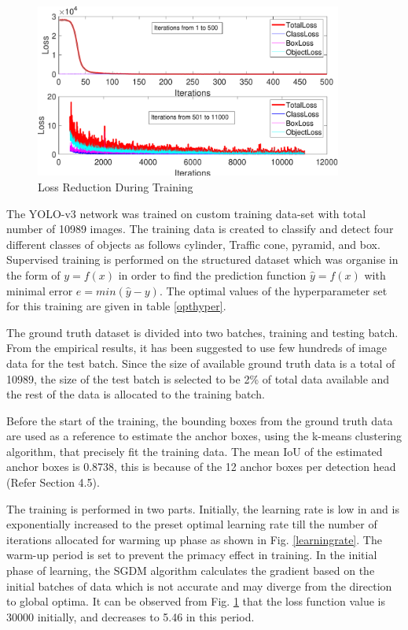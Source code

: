 \begin{figure}
    \centering
    \includegraphics[width=0.9\textwidth]{Images/Loss.pdf}
    \caption{Loss Reduction During Training}
    \label{loss}
\end{figure}

The YOLO-v3 network was trained on custom training data-set with total number of 10989 images. The training data is created to classify and detect four different classes of objects as follows cylinder, Traffic cone, pyramid, and box. Supervised training is performed on the structured dataset which was organise in the form of $y = f(x)$ in order to find the prediction function $\hat{y} = f(x)$ with minimal error $e = min(\hat{y} - y)$. The optimal values of the hyperparameter set for this training are given in table \ref{opthyper}. 

The ground truth dataset is divided into two batches, training and testing batch. From the empirical results, it has been suggested to use few hundreds of image data for the test batch. Since the size of available ground truth data is a total of 10989, the size of the test batch is selected to be 2\% of total data available and the rest of the data is allocated to the training batch.  

Before the start of the training, the bounding boxes from the ground truth data are used as a reference to estimate the anchor boxes, using the k-means clustering algorithm, that precisely fit the training data. The mean IoU of the estimated anchor boxes is 0.8738, this is because of the 12 anchor boxes per detection head (Refer Section 4.5). 

The training is performed in two parts. Initially, the learning rate is low in and is exponentially increased to the preset optimal learning rate till the number of iterations allocated for warming up phase as shown in Fig. \ref{learningrate}. The warm-up period is set to prevent the primacy effect in training. In the initial phase of learning, the SGDM algorithm calculates the gradient based on the initial batches of data which is not accurate and may diverge from the direction to global optima. It can be observed from Fig. \ref{loss} that the loss function value is $30000$ initially, and decreases to 5.46 in this period.

